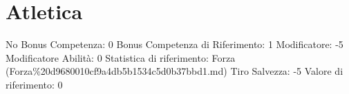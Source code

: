 \section{Atletica}\label{atletica}

\begin{description}
\tightlist
\item[Tags: ABI]
No Bonus Competenza: 0 Bonus Competenza di Riferimento: 1 Modificatore:
-5 Modificatore Abilità: 0 Statistica di riferimento: Forza
(Forza\%20d9680010cf9a4db5b1534c5d0b37bbd1.md) Tiro Salvezza: -5 Valore
di riferimento: 0
\end{description}
